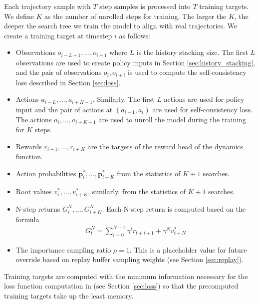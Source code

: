Each trajectory sample with $T$ step samples is processed into $T$ training targets.
We define $K$ as the number of unrolled steps for training.
The larger the $K$, the deeper the search tree we train the model to align with real trajectories.
We create a training target at timestep $i$ as follows:
\begin{itemize}
    \item Observations $o_{i - L + 1}, \dots, o_{i + 1}$ where $L$ is the history stacking size.
          The first $L$ observations are used to create policy inputs in Section \ref{sec:history_stacking},
          and the pair of observations $o_{i}, o_{i+i}$ is used to compute the self-consistency loss described in Section \ref{sec:loss}.

    \item Actions $a_{i - L}, \dots, a_{i + K - 1}$.
          Similarly, The first $L$ actions are used for policy input and the pair of actions at $(a_{i - 1}, a_{i})$ are used for self-consistency loss.
          The actions $a_{i}, \dots, a_{i + K - 1}$ are used to unroll the model during the training for $K$ steps.

    \item Rewards $r_{i + 1}, \dots, r_{i + K}$ are the targets of the reward head of the dynamics function.

    \item Action probabilities $\mathbf{p}^*_{i}, \dots, \mathbf{p}^*_{i + K}$ from the statistics of $K + 1$ searches.

    \item Root values $v^*_i, \dots, v^*_{i + K}$, similarly, from the statistics of $K + 1$ searches.

    \item N-step returns $G^N_{i}, \dots, G^N_{i + K}$.
          Each N-step return is computed based on the formula
          \begin{align*}
              G^N_{t} = \sum_{i = 0}^{N - 1}{\gamma^i r_{t+i+1}} + \gamma^Nv^*_{t + N}
          \end{align*}

    \item The importance sampling ratio $\rho = 1$. This is a placeholder value for future override based on replay buffer sampling weights (see Section \ref{sec:replay}).
\end{itemize}
Training targets are computed with the minimum information necessary for the loss function computation in (see Section \ref{sec:loss}) so that the precomputed training targets take up the least memory.

